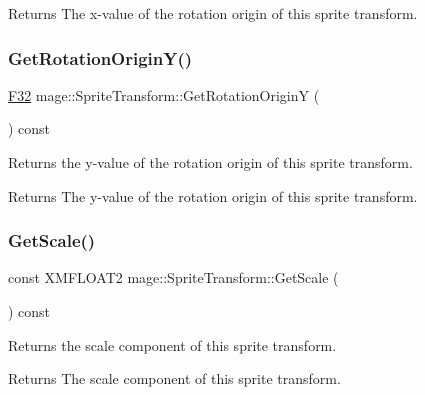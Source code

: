 \begin{DoxyReturn}{Returns}
The x-\/value of the rotation origin of this sprite transform. 
\end{DoxyReturn}
\hypertarget{structmage_1_1_sprite_transform_a762326097353f1303eede1b716cb9f51}{}\label{structmage_1_1_sprite_transform_a762326097353f1303eede1b716cb9f51} 
\subsubsection{\texorpdfstring{Get\+Rotation\+Origin\+Y()}{GetRotationOriginY()}}
{\footnotesize\ttfamily \hyperlink{namespacemage_aa97e833b45f06d60a0a9c4fc22ae02c0}{F32} mage\+::\+Sprite\+Transform\+::\+Get\+Rotation\+OriginY (\begin{DoxyParamCaption}{ }\end{DoxyParamCaption}) const\hspace{0.3cm}{\ttfamily [noexcept]}}

Returns the y-\/value of the rotation origin of this sprite transform.

\begin{DoxyReturn}{Returns}
The y-\/value of the rotation origin of this sprite transform. 
\end{DoxyReturn}
\hypertarget{structmage_1_1_sprite_transform_ac62a9a5b40abbbb40398885010990e55}{}\label{structmage_1_1_sprite_transform_ac62a9a5b40abbbb40398885010990e55} 
\subsubsection{\texorpdfstring{Get\+Scale()}{GetScale()}}
{\footnotesize\ttfamily const X\+M\+F\+L\+O\+A\+T2 mage\+::\+Sprite\+Transform\+::\+Get\+Scale (\begin{DoxyParamCaption}{ }\end{DoxyParamCaption}) const\hspace{0.3cm}{\ttfamily [noexcept]}}

Returns the scale component of this sprite transform.

\begin{DoxyReturn}{Returns}
The scale component of this sprite transform. 
\end{DoxyReturn}
\hypertarget{structmage_1_1_sprite_transform_af82246da3228dfc1588ca806ddf6315f}{}\label{structmage_1_1_sprite_transform_af82246da3228dfc1588ca806ddf6315f} 
